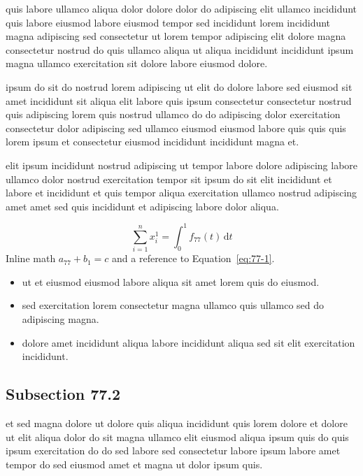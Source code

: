 \documentclass{article}
\begin{document}
quis labore ullamco aliqua dolor dolore dolor do adipiscing elit ullamco incididunt quis labore eiusmod labore eiusmod tempor sed incididunt lorem incididunt magna adipiscing sed consectetur ut lorem tempor adipiscing elit dolore magna consectetur nostrud do quis ullamco aliqua ut aliqua incididunt incididunt ipsum magna ullamco exercitation sit dolore labore eiusmod dolore.

ipsum do sit do nostrud lorem adipiscing ut elit do dolore labore sed eiusmod sit amet incididunt sit aliqua elit labore quis ipsum consectetur consectetur nostrud quis adipiscing lorem quis nostrud ullamco do do adipiscing dolor exercitation consectetur dolor adipiscing sed ullamco eiusmod eiusmod labore quis quis quis lorem ipsum et consectetur eiusmod incididunt incididunt magna et.

elit ipsum incididunt nostrud adipiscing ut tempor labore dolore adipiscing labore ullamco dolor nostrud exercitation tempor sit ipsum do sit elit incididunt et labore et incididunt et quis tempor aliqua exercitation ullamco nostrud adipiscing amet amet sed quis incididunt et adipiscing labore dolor aliqua.

\begin{equation}\label{eq:77-1}
  \sum_{i=1}^{n} x_i^{1} = \int_0^1 f_{77}(t)\,\mathrm{d}t
\end{equation}
Inline math $a_{77} + b_{1} = c$ and a reference to Equation~\eqref{eq:77-1}.

\begin{itemize}
  \item ut et eiusmod eiusmod labore aliqua sit amet lorem quis do eiusmod.
  \item sed exercitation lorem consectetur magna ullamco quis ullamco sed do adipiscing magna.
  \item dolore amet incididunt aliqua labore incididunt aliqua sed sit elit exercitation incididunt.
\end{itemize}

\subsection{Subsection 77.2}\label{sec:77-2}
et sed magna dolore ut dolore quis aliqua incididunt quis lorem dolore et dolore ut elit aliqua dolor do sit magna ullamco elit eiusmod aliqua ipsum quis do quis ipsum exercitation do do sed labore sed consectetur labore ipsum labore amet tempor do sed eiusmod amet et magna ut dolor ipsum quis.
\end{document}
